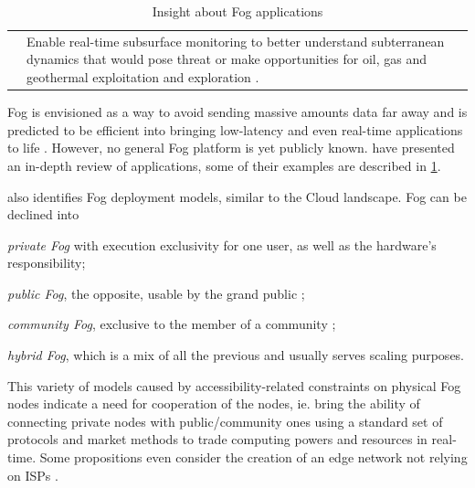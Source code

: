 \documentclass[11pt]{sdm}
\begin{document}
\begin{table}[t]
\begin{tabular}{@{} p{3cm}|p{12cm} @{}}
		                & Enable real-time subsurface monitoring to better understand subterranean dynamics that would pose threat or make opportunities for oil, gas and geothermal exploitation and exploration \cite{openfog_consortium_real-time_2018}.
		\\
		\cmidrule[1pt]{1-2}
	\end{tabular}
	\caption{\label{tab:applications}Insight about Fog applications \cite{ahmed_fog_2019}}
\end{table}

Fog is envisioned as a way to avoid sending massive amounts data far away and is predicted to be efficient into bringing low-latency and even real-time applications to life \cite{ahmed_fog_2019}. However, no general Fog platform is yet publicly known. \citet{ahmed_fog_2019} have presented an in-depth review of applications, some of their examples are described in \ref{tab:applications}.

\citet{ahmed_fog_2019} also identifies Fog deployment models, similar to the Cloud landscape. Fog can be declined into
\begin{enumerate*}[(a)]
	\item \emph{private Fog} with execution exclusivity for one user, as well as the hardware's responsibility;
	\item \emph{public Fog}, the opposite, usable by the grand public ;
	\item \emph{community Fog}, exclusive to the member of a community ;
	\item \emph{hybrid Fog}, which is a mix of all the previous and usually serves scaling purposes.
\end{enumerate*}
This variety of models caused by accessibility-related constraints on physical Fog nodes indicate a need for cooperation of the nodes, ie. bring the ability of connecting private nodes with public/community ones using a standard set of protocols and market methods to trade computing powers and resources in real-time. Some propositions even consider the creation of an edge network not relying on \glspl{ISP} \cite{bermbach_towards_2021}.
\end{document}
